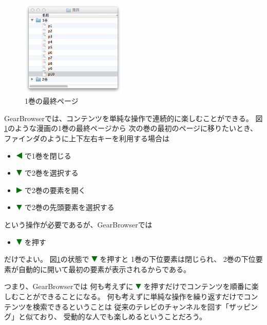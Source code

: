 \documentclass[twoside]{wiss}
\def\GB{\textsf{GearBrowser}}
\def\figwidth{50mm}
\def\downtriangle{ \includegraphics[width=3mm,bb=0 0 36 36]{figures/downtriangle.pdf} }
\def\righttriangle{ \includegraphics[width=3mm,bb=0 0 36 36]{figures/righttriangle.pdf} }
\def\lefttriangle{ \includegraphics[width=3mm,bb=0 0 36 36]{figures/lefttriangle.pdf} }
\begin{document}

\begin{figure}[H]
\centerline{\includegraphics[width=\figwidth,bb=0 0 344 318]{figures/9a8615b0242c9ba4deb77ca30ab94d7c.png}}
\caption{1巻の最終ページ}
\label{manga1}
\end{figure}

{\GB}では、コンテンツを単純な操作で連続的に楽しむことができる。
%
図\ref{manga1}のような漫画の1巻の最終ページから
次の巻の最初のページに移りたいとき、
ファインダのように上下左右キーを利用する場合は

\begin{itemize}
\item {\lefttriangle}で1巻を閉じる
\item {\downtriangle}で2巻を選択する
\item {\righttriangle}で2巻の要素を開く
\item {\downtriangle}で2巻の先頭要素を選択する
\end{itemize}

\noindent
という操作が必要であるが、{\GB}では

\begin{itemize}
\item {\downtriangle}を押す
\end{itemize}

\noindent
だけでよい。
図\ref{manga1}の状態で{\downtriangle}を押すと
1巻の下位要素は閉じられ、
2巻の下位要素が自動的に開いて最初の要素が表示されるからである。

つまり、{\GB}では
何も考えずに
{\downtriangle}を押すだけでコンテンツを順番に楽しむことができることになる。
何も考えずに単純な操作を繰り返すだけでコンテンツを検索できるということは
従来のテレビのチャンネルを回す「ザッピング」と似ており、
受動的な人でも楽しめるということだろう。
\end{document}
